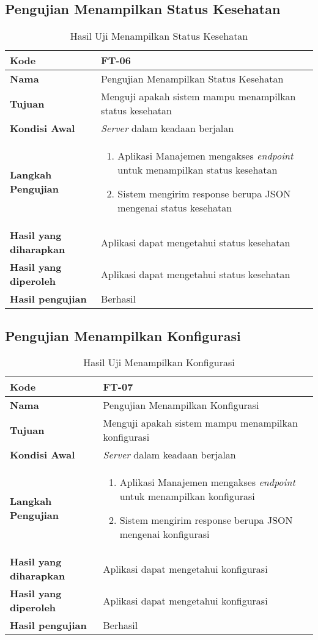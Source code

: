 \subsection{Pengujian Menampilkan Status Kesehatan}
\begin{longtable}{|p{3cm}|p{6.5cm}|}
	\caption{Hasil Uji Menampilkan Status Kesehatan} \label{t:uji_menampilkan_status_kesehatan} \\ \hline
	\textbf{Kode} & FT-06 \\ \hline
	\textbf{Nama} & Pengujian Menampilkan Status Kesehatan \\ \hline
	\textbf{Tujuan} & Menguji apakah sistem mampu menampilkan status kesehatan \\ \hline
	\textbf{Kondisi Awal} &  \textit{Server} dalam keadaan berjalan\\ \hline
	\textbf{Langkah Pengujian} &  
	\begin{enumerate}
		\item Aplikasi Manajemen mengakses \textit{endpoint} untuk menampilkan status kesehatan
		\item Sistem mengirim response berupa JSON mengenai status kesehatan
	\end{enumerate} \\ \hline
	\textbf{Hasil yang diharapkan} & Aplikasi dapat mengetahui status kesehatan \\ \hline
	\textbf{Hasil yang diperoleh} & Aplikasi dapat mengetahui status kesehatan \\ \hline
	\textbf{Hasil pengujian} & Berhasil \\ \hline
\end{longtable}
\subsection{Pengujian Menampilkan Konfigurasi}
\begin{longtable}{|p{3cm}|p{6.5cm}|}
	\caption{Hasil Uji Menampilkan Konfigurasi} \label{t:uji_menampilkan_konfigurasi} \\ \hline
	\textbf{Kode} & FT-07 \\ \hline
	\textbf{Nama} & Pengujian Menampilkan Konfigurasi \\ \hline
	\textbf{Tujuan} & Menguji apakah sistem mampu menampilkan konfigurasi \\ \hline
	\textbf{Kondisi Awal} &  \textit{Server} dalam keadaan berjalan\\ \hline
	\textbf{Langkah Pengujian} &  
	\begin{enumerate}
		\item Aplikasi Manajemen mengakses \textit{endpoint} untuk menampilkan konfigurasi
		\item Sistem mengirim response berupa JSON mengenai konfigurasi
	\end{enumerate} \\ \hline
	\textbf{Hasil yang diharapkan} & Aplikasi dapat mengetahui konfigurasi \\ \hline
	\textbf{Hasil yang diperoleh} & Aplikasi dapat mengetahui konfigurasi \\ \hline
	\textbf{Hasil pengujian} & Berhasil \\ \hline
\end{longtable}

